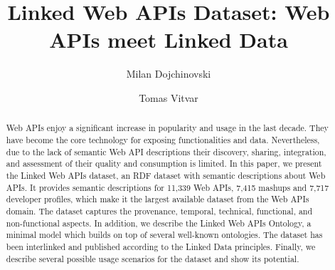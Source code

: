 \documentclass[runningheads,a4paper]{llncs}
\begin{document}
\mainmatter

\title{Linked Web APIs Dataset: Web APIs meet Linked Data}
\author{Milan Dojchinovski \and
Tomas Vitvar}

\maketitle

\begin{abstract}
Web APIs enjoy a significant increase in popularity and usage in the last decade. They have become the core technology for exposing functionalities and data. Nevertheless, due to the lack of semantic Web API descriptions their discovery, sharing, integration, and assessment of their quality and consumption is limited. In this paper, we present the Linked Web APIs dataset, an RDF dataset with semantic descriptions about Web APIs. It provides semantic descriptions for 11,339 Web APIs, 7,415 mashups and 7,717 developer profiles, which make it the largest available dataset from the Web APIs domain. The dataset captures the provenance, temporal, technical, functional, and non-functional aspects. In addition, we describe the Linked Web APIs Ontology, a minimal model which builds on top of several well-known ontologies. The dataset has been interlinked and published according to the Linked Data principles. Finally, we describe several possible usage scenarios for the dataset and show its potential.

\end{abstract}
\end{document}
